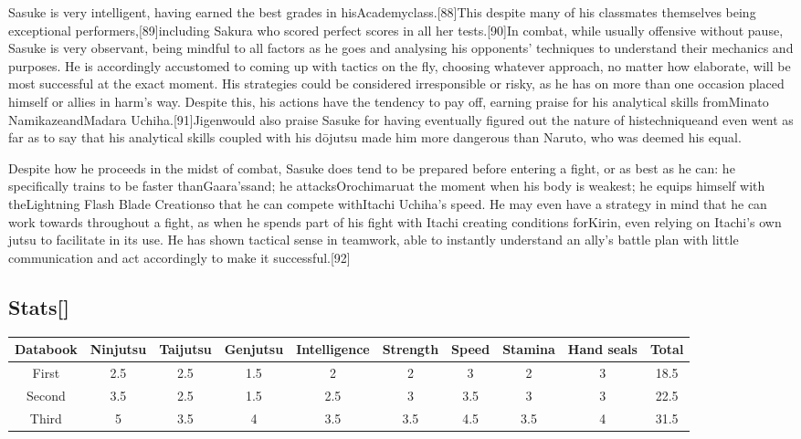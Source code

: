 \documentclass[a4paper,12pt]{article}
\begin{document}
Sasuke is very intelligent, having earned the best grades in hisAcademyclass.[88]This despite many of his classmates themselves being exceptional performers,[89]including Sakura who scored perfect scores in all her tests.[90]In combat, while usually offensive without pause, Sasuke is very observant, being mindful to all factors as he goes and analysing his opponents' techniques to understand their mechanics and purposes. He is accordingly accustomed to coming up with tactics on the fly, choosing whatever approach, no matter how elaborate, will be most successful at the exact moment. His strategies could be considered irresponsible or risky, as he has on more than one occasion placed himself or allies in harm's way. Despite this, his actions have the tendency to pay off, earning praise for his analytical skills fromMinato NamikazeandMadara Uchiha.[91]Jigenwould also praise Sasuke for having eventually figured out the nature of histechniqueand even went as far as to say that his analytical skills coupled with his dōjutsu made him more dangerous than Naruto, who was deemed his equal.\\ \par \vspace{0.5cm}

Despite how he proceeds in the midst of combat, Sasuke does tend to be prepared before entering a fight, or as best as he can: he specifically trains to be faster thanGaara'ssand; he attacksOrochimaruat the moment when his body is weakest; he equips himself with theLightning Flash Blade Creationso that he can compete withItachi Uchiha's speed. He may even have a strategy in mind that he can work towards throughout a fight, as when he spends part of his fight with Itachi creating conditions forKirin, even relying on Itachi's own jutsu to facilitate in its use. He has shown tactical sense in teamwork, able to instantly understand an ally's battle plan with little communication and act accordingly to make it successful.[92]\\ \par \vspace{0.5cm}

\subsection*{Stats[]}\n\n\begin{tabular}{|c|c|c|c|c|c|c|c|c|c|} \hline
Databook & Ninjutsu & Taijutsu & Genjutsu & Intelligence & Strength & Speed & Stamina & Hand seals & Total \\
 \hline
First & 2.5 & 2.5 & 1.5 & 2 & 2 & 3 & 2 & 3 & 18.5 \\
Second & 3.5 & 2.5 & 1.5 & 2.5 & 3 & 3.5 & 3 & 3 & 22.5 \\
Third & 5 & 3.5 & 4 & 3.5 & 3.5 & 4.5 & 3.5 & 4 & 31.5 \\
\end{tabular}\\ \par \vspace{0.5cm}
\end{document}
